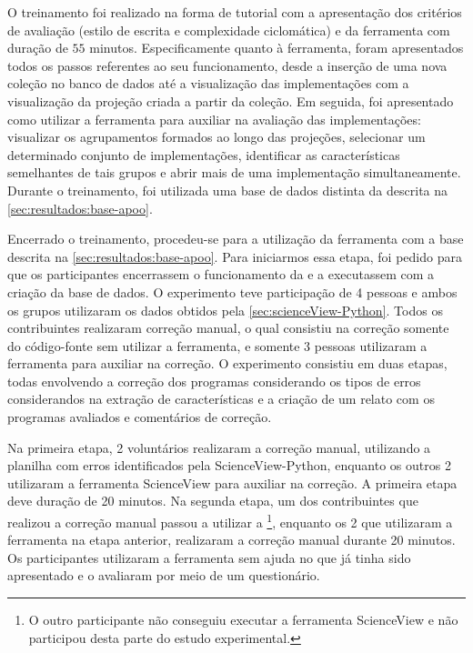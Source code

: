 		O treinamento foi realizado na forma de tutorial com a apresentação dos critérios
		de avaliação (estilo de escrita e complexidade ciclomática) e da ferramenta com
		duração de $55$ minutos. Especificamente quanto à ferramenta, foram apresentados
		todos os passos referentes ao seu funcionamento, desde a inserção de uma nova
		coleção no banco de dados até a visualização das implementações com a visualização
		da projeção criada a partir da coleção. Em seguida, foi apresentado como utilizar
		a ferramenta para auxiliar na avaliação das implementações: visualizar os
		agrupamentos formados ao longo das projeções, selecionar um determinado conjunto
		de implementações, identificar as características semelhantes de tais grupos e
		abrir mais de uma implementação simultaneamente. Durante o treinamento, foi utilizada uma
		base de dados distinta da descrita na \cref{sec:resultados:base-apoo}.
		
		Encerrado o treinamento, procedeu-se para a utilização da ferramenta com a base
		descrita na \cref{sec:resultados:base-apoo}. Para iniciarmos essa etapa, foi
		pedido para que os participantes encerrassem o funcionamento da 
		e a executassem com a criação da base de dados. O experimento teve participação
		de 4 pessoas e ambos os grupos utilizaram os dados obtidos pela 
		\cref{sec:scienceView-Python}. Todos os contribuintes realizaram  correção manual,
		o qual consistiu na correção somente do código-fonte sem utilizar a ferramenta, e
		somente 3 pessoas utilizaram a ferramenta  para auxiliar
		na correção. O experimento consistiu em duas etapas, todas envolvendo a correção
		dos programas considerando os tipos de erros considerandos na extração de
		características e a criação de um relato com os programas avaliados e comentários
		de correção. 

		Na primeira etapa, 2 voluntários realizaram a correção manual, utilizando a planilha
		com erros identificados pela ScienceView-Python, enquanto os outros 2
		utilizaram a ferramenta ScienceView para auxiliar na correção. A primeira etapa deve
		duração de 20 minutos. Na segunda etapa, um dos contribuintes que realizou a correção
		manual passou a utilizar a \footnote{O outro participante não
		conseguiu executar a ferramenta ScienceView e não participou desta parte do estudo
		experimental.}, enquanto os 2 que utilizaram a ferramenta
		na etapa anterior, realizaram a correção manual durante 20 minutos. Os participantes
		utilizaram a ferramenta sem ajuda no que já tinha sido apresentado e o
		avaliaram por meio de um questionário. 	

